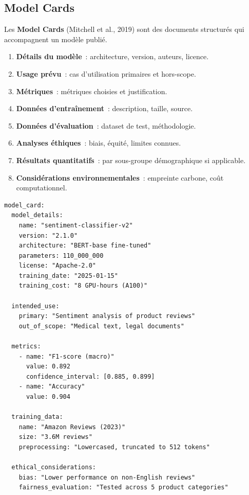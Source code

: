 \subsection{Model Cards}

Les \textbf{Model Cards} (Mitchell et al., 2019) sont des documents
structur\'es qui accompagnent un mod\`ele publi\'e.

\begin{bonnepratique}[title=\textbf{Contenu d'une Model Card}]
\begin{enumerate}
  \item \textbf{D\'etails du mod\`ele}~: architecture, version, auteurs,
    licence.
  \item \textbf{Usage pr\'evu}~: cas d'utilisation primaires et hors-scope.
  \item \textbf{M\'etriques}~: m\'etriques choisies et justification.
  \item \textbf{Donn\'ees d'entra\^inement}~: description, taille, source.
  \item \textbf{Donn\'ees d'\'evaluation}~: dataset de test, m\'ethodologie.
  \item \textbf{Analyses \'ethiques}~: biais, \'equit\'e, limites connues.
  \item \textbf{R\'esultats quantitatifs}~: par sous-groupe
    d\'emographique si applicable.
  \item \textbf{Consid\'erations environnementales}~: empreinte carbone,
    co\^ut computationnel.
\end{enumerate}
\end{bonnepratique}

\begin{codeblock}[title=\textbf{Model Card en YAML (extrait)}]
\begin{verbatim}
model_card:
  model_details:
    name: "sentiment-classifier-v2"
    version: "2.1.0"
    architecture: "BERT-base fine-tuned"
    parameters: 110_000_000
    license: "Apache-2.0"
    training_date: "2025-01-15"
    training_cost: "8 GPU-hours (A100)"

  intended_use:
    primary: "Sentiment analysis of product reviews"
    out_of_scope: "Medical text, legal documents"

  metrics:
    - name: "F1-score (macro)"
      value: 0.892
      confidence_interval: [0.885, 0.899]
    - name: "Accuracy"
      value: 0.904

  training_data:
    name: "Amazon Reviews (2023)"
    size: "3.6M reviews"
    preprocessing: "Lowercased, truncated to 512 tokens"

  ethical_considerations:
    bias: "Lower performance on non-English reviews"
    fairness_evaluation: "Tested across 5 product categories"
\end{verbatim}
\end{codeblock}

